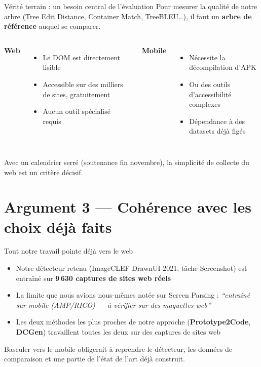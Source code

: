 \documentclass[11pt]{beamer}
\begin{document}
\begin{frame}{Vérité terrain : un besoin central de l'évaluation}
  Pour mesurer la qualité de notre arbre (Tree Edit Distance, Container
  Match, TreeBLEU\dots), il faut un \textbf{arbre de référence} auquel se
  comparer.

  \vspace{1em}
  \begin{columns}
    \textbf{Web}
    \begin{itemize}
      \item Le DOM est directement lisible
      \item Accessible sur des milliers de sites, gratuitement
      \item Aucun outil spécialisé requis
    \end{itemize}

    \textbf{Mobile}
    \begin{itemize}
      \item Nécessite la décompilation d'APK
      \item Ou des outils d'accessibilité complexes
      \item Dépendance à des datasets déjà figés
    \end{itemize}
  \end{columns}

  \vspace{1em}
  \alert{Avec un calendrier serré (soutenance fin novembre), la simplicité de
  collecte du web est un critère décisif.}
\end{frame}

\section{Argument 3 --- Cohérence avec les choix déjà faits}

\begin{frame}{Tout notre travail pointe déjà vers le web}
  \begin{itemize}
    \item Notre détecteur retenu (ImageCLEF DrawnUI 2021, tâche Screenshot)
      est entraîné sur \textbf{9\,630 captures de sites web réels}
    \item La limite que nous avions nous-mêmes notée sur Screen Parsing :
      \textit{``entraîné sur mobile (AMP/RICO) --- à vérifier sur des
      maquettes web''}
    \item Les deux méthodes les plus proches de notre approche
      (\textbf{Prototype2Code}, \textbf{DCGen}) travaillent toutes les deux
      sur des captures de sites web
  \end{itemize}

  \vspace{1em}
  \alert{Basculer vers le mobile obligerait à reprendre le détecteur, les
  données de comparaison et une partie de l'état de l'art déjà construit.}
\end{frame}
\end{document}

